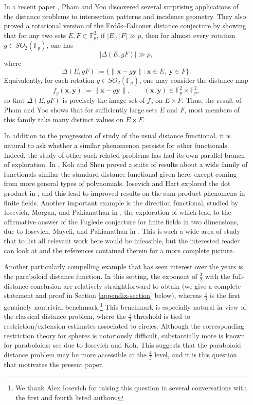 \documentclass{article}
\newcommand{\1}{\mathbf{1}}
\begin{document}
In a recent paper \cite{phamYoo23}, Pham and Yoo discovered several surprising applications of the distance problems to intersection patterns and incidence geometry. They also proved a rotational version of the Erd\H{o}s--Falconer distance conjecture by showing that for any two sets $E,F\subset \mathbb{F}_p^2$, if $|E|,|F|\gg p$, then for almost every rotation $g\in SO_2(\mathbb{F}_p)$, one has
\[
|\Delta(E,gF)|\gg p,
\]
where
\[
\Delta(E,gF):=\{\|\mathbf{x}-g\mathbf{y}\|:\mathbf{x}\in E,\ \mathbf{y}\in F\}.
\]
Equivalently, for each rotation $g\in SO_2(\mathbb{F}_p)$, one may consider the distance map
\[
f_g(\mathbf{x},\mathbf{y}):=\|\mathbf{x}-g\mathbf{y}\|,
\qquad (\mathbf{x},\mathbf{y})\in \mathbb{F}_p^2\times\mathbb{F}_p^2,
\]
so that $\Delta(E,gF)$ is precisely the image set of $f_g$ on $E\times F$. Thus, the result of Pham and Yoo shows that for sufficiently large sets $E$ and $F$, most members of this family take many distinct values on $E\times F$.


In addition to the progression of study of the usual distance functional, it is natural to ask whether a similar phenomenon persists for other functionals. Indeed, the study of other such related problems has had its own parallel branch of exploration. In \cite{KS12}, Koh and Shen proved a suite of results about a wide family of functionals similar the standard distance functional given here, except coming from more general types of polynomials. Iosevich and Hart explored the dot product in \cite{IH08}, and this lead to improved results on the sum-product phenomena in finite fields. Another important example is the direction functional, studied by Iosevich, Morgan, and Pakianathan in \cite{IMP11}, the exploration of which lead to the affirmative answer of the Fuglede conjecture for finite fields in two dimensions, due to Iosevich, Mayeli, and Pakianathan in \cite{IMP17}. This is such a wide area of study that to list all relevant work here would be infeasible, but the interested reader can look at \cite{CL24, kohkoh, KPV2021, L19, LMP20, phamboxing24} and the references contained therein for a more complete picture.

Another particularly compelling example that has seen interest over the years is the paraboloid distance function. In this setting, the exponent of $\frac{3}{2}$ with the full-distance conclusion are relatively straightforward to obtain (we give a complete statement and proof in Section \ref{appendix-section} below), whereas $\frac{4}{3}$ is the first genuinely nontrivial benchmark.\footnote{We thank Alex Iosevich for raising this question in several conversations with the first and fourth listed authors.} This benchmark is especially natural in view of the classical distance problem, where the $\frac{4}{3}$-threshold is tied to restriction/extension estimates associated to circles. Although the corresponding restriction theory for spheres is notoriously difficult, substantially more is known for paraboloids; see \cite{IK10} due to Iosevich and Koh. This suggests that the paraboloid distance problem may be more accessible at the $\frac{4}{3}$ level, and it is this question that motivates the present paper.
\end{document}
